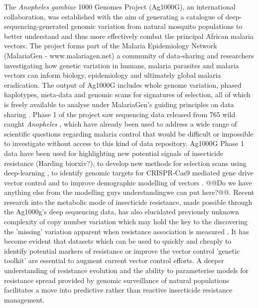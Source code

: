 \documentclass[a4paper,11pt,abstracton,hidelinks]{scrartcl}
\begin{document}
The \textit{Anopheles gambiae} 1000 Genomes Project (Ag1000G), an international collaboration, was established with the aim of generating a catalogue of deep-sequencing-generated genomic variation from natural mosquito populations to better understand and thus more effectively combat the principal African malaria vectors. 
%
The project forms part of the Malaria Epidemiology Network (MalariaGen - www.malariagen.net) a community of data-sharing and researchers investigating how genetic variation in humans, malaria parasites and malaria vectors can inform biology, epidemiology and ultimately global malaria eradication.
%
The output of Ag1000G includes whole genome variation, phased haplotypes, meta-data and genomic scans for signatures of selection, all of which is freely available to analyse under MalariaGen's guiding principles on data sharing \cite{network2008, chokshi2006, parker2009}.
%
Phase 1 of the project saw sequencing data released from 765 wild caught \textit{Anopheles} \cite{Ag1000gConsortium2017}, which have already been used to address a wide range of scientific questions regarding malaria control that would be difficult or impossible to investigate without access to this kind of data repository.
%
Ag1000G Phase 1 data have been used for highlighting new potential signals of insecticide resistance (Harding biorxiv?), to develop new methods for selection scans using deep-learning \cite{xue2019}, to identify genomic targets for CRISPR-Cas9 mediated gene drive vector control \cite{kyrou2018} and to improve demographic modelling of vectors \cite{khatri2018}.
%
@@Do we have anything else from the modelling guys understandingwe can put here?@@.
%
Recent research into the metabolic mode of insecticide resistance, made possible through the Ag1000g's deep sequencing data, has also elucidated previously unknown complexity of copy number variation which may hold the key to the discovering the 'missing' variation apparent when resistance association is measured \cite{lucas2019, mitchell2014}.
%
It has become evident that datasets which can be used to quickly and cheaply to identify potential markers of resistance or improve the vector control 'genetic toolkit' are essential to augment current vector control efforts.
%
A deeper understanding of resistance evolution and the ability to parameterise models for resistance spread provided by genomic surveillance of natural populations facilitates a move into predictive rather than reactive insecticide resistance management.
\end{document}
